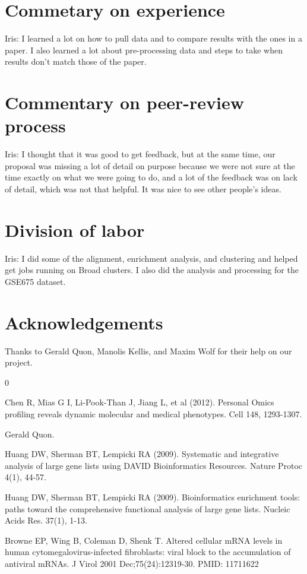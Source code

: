 \documentclass[aps,prd,final,onecolumn,a4paper,10pt]{revtex4}
\begin{document}
\section{Commetary on experience}
Iris: I learned a lot on how to pull data and to compare results with the ones in a paper. I also learned a lot about pre-processing data and steps to take when results don't match those of the paper.

\section{Commentary on peer-review process}
Iris: I thought that it was good to get feedback, but at the same time, our proposal was missing a lot of detail on purpose because we were not sure at the time exactly on what we were going to do, and a lot of the feedback was on lack of detail, which was not that helpful. It was nice to see other people's ideas.

\section{Division of labor}

Iris: I did some of the alignment, enrichment analysis, and clustering and helped get jobs running on Broad clusters. I also did the analysis and processing for the GSE675 dataset.

\section{Acknowledgements}
Thanks to Gerald Quon, Manolis Kellis, and Maxim Wolf for their help on our project.

\begin{thebibliography} {0}

 Chen R, Mias G I, Li-Pook-Than J, Jiang L, et al (2012). Personal Omics profiling reveals dynamic molecular and medical phenotypes. Cell 148, 1293-1307.

 Gerald Quon.

 Huang DW, Sherman BT, Lempicki RA (2009). Systematic and integrative analysis of large gene lists using DAVID Bioinformatics Resources. Nature Protoc 4(1), 44-57.

 Huang DW, Sherman BT, Lempicki RA (2009). Bioinformatics enrichment tools: paths toward the comprehensive functional analysis of large gene lists. Nucleic Acids Res. 37(1), 1-13.

 Browne EP, Wing B, Coleman D, Shenk T. Altered cellular mRNA levels in human cytomegalovirus-infected fibroblasts: viral block to the accumulation of antiviral mRNAs. J Virol 2001 Dec;75(24):12319-30. PMID: 11711622


\end{thebibliography}
\end{document}
